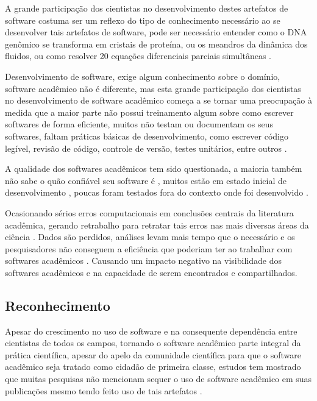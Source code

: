 A grande participação dos cientistas no desenvolvimento destes artefatos de
software costuma ser um reflexo do tipo de conhecimento necessário ao se
desenvolver tais artefatos de software, pode ser necessário entender como o DNA
genômico se transforma em cristais de proteína, ou os meandros da dinâmica dos
fluidos, ou como resolver 20 equações diferenciais parciais simultâneas
\cite{segal2008developing}.

Desenvolvimento de software, exige algum conhecimento sobre o domínio, software
acadêmico não é diferente, mas esta grande participação dos cientistas no
desenvolvimento de software acadêmico começa a se tornar uma preocupação à
medida que a maior parte não possui treinamento algum sobre como escrever
softwares de forma eficiente, muitos não testam ou documentam os seus
softwares, faltam práticas básicas de desenvolvimento, como escrever código
legível, revisão de código, controle de versão, testes unitários, entre outros
\cite{wilson2017good}.

A qualidade dos softwares acadêmicos tem sido questionada,
a maioria também não sabe o quão confiável seu software é \cite{Merali2010Computational},
muitos estão em estado inicial de desenvolvimento \cite{marshall2013tools},
poucas foram testados fora do contexto onde foi desenvolvido \cite{Portillo12}.

Ocasionando sérios erros computacionais em conclusões centrais da literatura
acadêmica, gerando retrabalho para retratar tais erros nas mais diversas áreas
da ciência \cite{Merali2010Computational}. Dados são perdidos, análises levam
mais tempo que o necessário e os pesquisadores não conseguem a eficiência que
poderiam ter ao trabalhar com softwares acadêmicos \cite{wilson2017good}.
Causando um impacto negativo na visibilidade dos softwares acadêmicos
\cite{howison2013, katz2014transitive} e na capacidade de serem encontrados e
compartilhados.

\subsection{Reconhecimento}


Apesar do crescimento no uso de software e na consequente dependência entre
cientistas de todos os campos, tornando o software acadêmico parte integral da
prática científica, apesar do apelo da comunidade científica para que o
software acadêmico seja tratado como cidadão de primeira classe, estudos tem
mostrado que muitas pesquisas não mencionam sequer o uso de software acadêmico
em suas publicações mesmo tendo feito uso de tais artefatos
\cite{momcheva2015software} \cite{howison2016software}.

